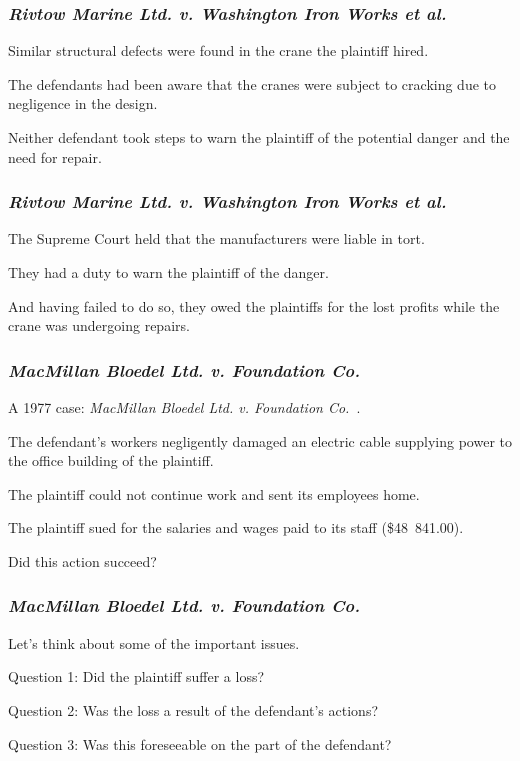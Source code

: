 \begin{frame}
\frametitle{\textit{Rivtow Marine Ltd. v. Washington Iron Works et al.}}

Similar structural defects were found in the crane the plaintiff hired.

The defendants had been aware that the cranes were subject to cracking due to negligence in the design. 

Neither defendant took steps to warn the plaintiff of the potential danger and the need for repair.

\end{frame}



\begin{frame}
\frametitle{\textit{Rivtow Marine Ltd. v. Washington Iron Works et al.}}

The Supreme Court held that the manufacturers were liable in tort.

They had a duty to warn the plaintiff of the danger.

And having failed to do so, they owed the plaintiffs for the lost profits while the crane was undergoing repairs.

\end{frame}



\begin{frame}
\frametitle{\textit{MacMillan Bloedel Ltd. v. Foundation Co.}}

A 1977 case: \textit{MacMillan Bloedel Ltd. v. Foundation Co.}~\cite{lpe}.

The defendant's workers negligently damaged an electric cable supplying power to the office building of the plaintiff.

The plaintiff could not continue work and sent its employees home.

The plaintiff sued for the salaries and wages paid to its staff (\$48~841.00).

Did this action succeed?

\end{frame}



\begin{frame}
\frametitle{\textit{MacMillan Bloedel Ltd. v. Foundation Co.}}

Let's think about some of the important issues.

Question 1: Did the plaintiff suffer a loss?

Question 2: Was the loss a result of the defendant's actions?

Question 3: Was this foreseeable on the part of the defendant?

\end{frame}



